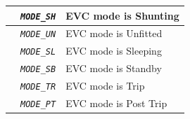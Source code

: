 \documentclass{template/openetcs}
\begin{document}
\begin{itemize}
\begin{longtable}{|l|l|l|}
			\hline

			&	\begin{minipage}[t]{0.40\linewidth} \emph{\texttt{MODE\_SH}} \end{minipage}
			&	\begin{minipage}[t]{0.38\linewidth} EVC mode is Shunting \end{minipage} \\ 

			\hline

			&	\begin{minipage}[t]{0.40\linewidth} \emph{\texttt{MODE\_UN}} \end{minipage}
			&	\begin{minipage}[t]{0.38\linewidth} EVC mode is Unfitted \end{minipage} \\ 

			\hline

			&	\begin{minipage}[t]{0.40\linewidth} \emph{\texttt{MODE\_SL}} \end{minipage}
			&	\begin{minipage}[t]{0.38\linewidth} EVC mode is Sleeping \end{minipage} \\ 

			\hline

			&	\begin{minipage}[t]{0.40\linewidth} \emph{\texttt{MODE\_SB}} \end{minipage}
			&	\begin{minipage}[t]{0.38\linewidth} EVC mode is Standby \end{minipage} \\ 

			\hline

			&	\begin{minipage}[t]{0.40\linewidth} \emph{\texttt{MODE\_TR}} \end{minipage}
			&	\begin{minipage}[t]{0.38\linewidth} EVC mode is Trip \end{minipage} \\ 

			\hline

			&	\begin{minipage}[t]{0.40\linewidth} \emph{\texttt{MODE\_PT}} \end{minipage}
			&	\begin{minipage}[t]{0.38\linewidth} EVC mode is Post Trip \end{minipage} \\ 


\end{longtable}
\end{itemize}
\end{document}
